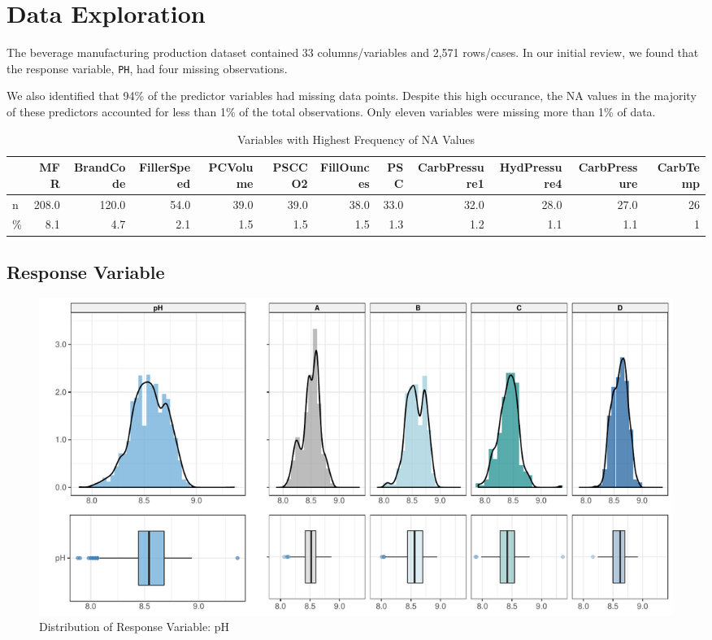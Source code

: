 \documentclass[]{report}
\begin{document}
\hypertarget{data-exploration}{%
\chapter{Data Exploration}\label{data-exploration}}

The beverage manufacturing production dataset contained 33
columns/variables and 2,571 rows/cases. In our initial review, we found
that the response variable, \texttt{PH}, had four missing observations.

We also identified that 94\% of the predictor variables had missing data
points. Despite this high occurance, the NA values in the majority of
these predictors accounted for less than 1\% of the total observations.
Only eleven variables were missing more than 1\% of data.

\begin{table}[H]

\caption{\label{tab:unnamed-chunk-2}Variables with Highest Frequency of NA Values}
\centering
\fontsize{8}{10}\selectfont
\begin{tabular}{lrrrrrrrrrrr}
\toprule
\textbf{ } & \textbf{MFR} & \textbf{BrandCode} & \textbf{FillerSpeed} & \textbf{PCVolume} & \textbf{PSCCO2} & \textbf{FillOunces} & \textbf{PSC} & \textbf{CarbPressure1} & \textbf{HydPressure4} & \textbf{CarbPressure} & \textbf{CarbTemp}\\
\midrule
\rowcolor{gray!6}  n & 208.0 & 120.0 & 54.0 & 39.0 & 39.0 & 38.0 & 33.0 & 32.0 & 28.0 & 27.0 & 26\\
\% & 8.1 & 4.7 & 2.1 & 1.5 & 1.5 & 1.5 & 1.3 & 1.2 & 1.1 & 1.1 & 1\\
\bottomrule
\end{tabular}
\end{table}

\hypertarget{response-variable}{%
\section{Response Variable}\label{response-variable}}

\begin{figure}

\hfill{}\includegraphics[width=1\textwidth]{Proj2-JM_files/figure-latex/unnamed-chunk-3-1} 

\caption{Distribution of Response Variable: pH}\label{fig:unnamed-chunk-3}
\end{figure}
\end{document}
